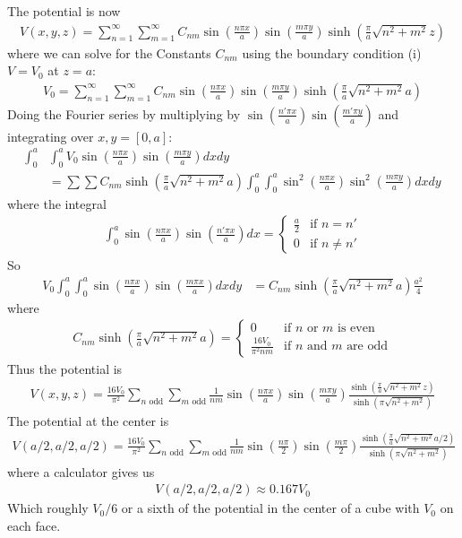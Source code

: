 \documentclass[../main.tex]{subfiles}
\begin{document}
The potential is now
\begin{align*}
    V(x,y,z) = \sum_{n=1}^\infty \sum_{m=1}^\infty C_{nm} \sin(\frac{n\pi x}{a}) \sin(\frac{m\pi y}{a}) \sinh(\frac{\pi}{a} \sqrt{n^2 + m^2} z)
\end{align*}
where we can solve for the Constants $C_{nm}$ using the boundary condition (i) $V = V_0$ at $z = a$:
\begin{align*}
    V_0 = \sum_{n=1}^\infty \sum_{m=1}^\infty C_{nm} \sin(\frac{n\pi x}{a}) \sin(\frac{m\pi y}{a}) \sinh(\frac{\pi}{a} \sqrt{n^2 + m^2} a)
\end{align*}
Doing the Fourier series by multiplying by $\sin(\frac{n'\pi x}{a}) \sin(\frac{m'\pi y}{a})$ and integrating over $x,y = [0,a]$:
\begin{align*}
    \int_0^a& \int_0^a V_0 \sin(\frac{n\pi x}{a}) \sin(\frac{m\pi y}{a}) dx dy \\
    &= \sum\sum C_{nm} \sinh(\frac{\pi}{a} \sqrt{n^2 + m^2} a) \int_0^a \int_0^a \sin^2(\frac{n\pi x}{a}) \sin^2(\frac{m\pi y}{a}) dx dy
\end{align*}
where the integral
\begin{align*}
    \int_0^a \sin(\frac{n\pi x}{a})\sin(\frac{n'\pi x}{a}) dx = \begin{cases}
        \frac{a}{2} & \text{if } n = n' \\
        0 & \text{if } n \neq n'
    \end{cases}
\end{align*}
So
\begin{align*}
    V_0 \int_0^a \int_0^a \sin(\frac{n\pi x}{a}) \sin(\frac{m\pi x}{a}) dx dy &= C_{nm} \sinh(\frac{\pi}{a} \sqrt{n^2 + m^2} a) \frac{a^2}{4}
\end{align*}
where
\begin{align*}
    C_{nm} \sinh(\frac{\pi}{a} \sqrt{n^2 + m^2} a) = \begin{cases}
        0 & \text{if } n \text{ or } m \text{ is even} \\
        \frac{16V_0}{\pi^2 n m} & \text{if } n \text{ and } m \text{ are odd}
    \end{cases}
\end{align*}
Thus the potential is
\begin{align*}
    \boxed{
        V(x,y,z) = \frac{16 V_0}{\pi^2} \sum_{n \text{ odd}} \sum_{m \text{ odd}} \frac{1}{nm} \sin(\frac{n\pi x}{a}) \sin(\frac{m\pi y}{a})
            \frac{\sinh(\frac{\pi}{a} \sqrt{n^2 + m^2} z)}{\sinh(\pi\sqrt{n^2 + m^2})}
    }
\end{align*}
The potential at the center is
\begin{align*}
    V(a/2, a/2, a/2) = \frac{16 V_0}{\pi^2} \sum_{n \text{ odd}} \sum_{m \text{ odd}} \frac{1}{nm} \sin(\frac{n\pi}{2}) \sin(\frac{m\pi}{2})
            \frac{\sinh(\frac{\pi}{a} \sqrt{n^2 + m^2} a/2)}{\sinh(\pi\sqrt{n^2 + m^2})}
\end{align*}
where a calculator gives us
\begin{align*}
    V(a/2, a/2, a/2) \approx 0.167 V_0
\end{align*}
Which roughly $V_0/6$ or a sixth of the potential in the center of a cube with $V_0$ on each face.
\end{document}
